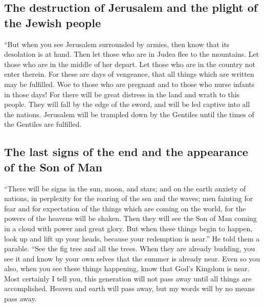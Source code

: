 \hypertarget{the-destruction-of-jerusalem-and-the-plight-of-the-jewish-people}{%
\subsection{The destruction of Jerusalem and the plight of the Jewish
people}\label{the-destruction-of-jerusalem-and-the-plight-of-the-jewish-people}}

 ``But when you see Jerusalem surrounded by armies, then
know that its desolation is at hand.  Then let those who
are in Judea flee to the mountains. Let those who are in the middle of
her depart. Let those who are in the country not enter therein.
 For these are days of vengeance, that all things which
are written may be fulfilled.  Woe to those who are
pregnant and to those who nurse infants in those days! For there will be
great distress in the land and wrath to this people. 
They will fall by the edge of the sword, and will be led captive into
all the nations. Jerusalem will be trampled down by the Gentiles until
the times of the Gentiles are fulfilled.

\hypertarget{the-last-signs-of-the-end-and-the-appearance-of-the-son-of-man}{%
\subsection{The last signs of the end and the appearance of the Son of
Man}\label{the-last-signs-of-the-end-and-the-appearance-of-the-son-of-man}}

 ``There will be signs in the sun, moon, and stars; and
on the earth anxiety of nations, in perplexity for the roaring of the
sea and the waves;  men fainting for fear and for
expectation of the things which are coming on the world, for the powers
of the heavens will be shaken.  Then they will see the
Son of Man coming in a cloud with power and great glory. 
But when these things begin to happen, look up and lift up your heads,
because your redemption is near.''  He told them a
parable. ``See the fig tree and all the trees.  When they
are already budding, you see it and know by your own selves that the
summer is already near.  Even so you also, when you see
these things happening, know that God's Kingdom is near. 
Most certainly I tell you, this generation will not pass away until all
things are accomplished.  Heaven and earth will pass
away, but my words will by no means pass away.

